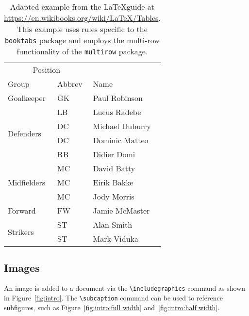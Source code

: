\begin{table}[h] %
    \centering
    \begin{tabular}{lll}
        \toprule
        \multicolumn{2}{c}{Position} \\
        \cmidrule{1-2} %
        Group                        & Abbrev & Name            \\
        \midrule
        Goalkeeper                   & GK     & Paul Robinson   \\
        \midrule
        \multirow{4}{*}{Defenders}   & LB     & Lucus Radebe    \\
        & DC     & Michael Duburry \\
        & DC     & Dominic Matteo  \\
        & RB     & Didier Domi     \\
        \midrule
        \multirow{3}{*}{Midfielders} & MC     & David Batty     \\
        & MC     & Eirik Bakke     \\
        & MC     & Jody Morris     \\
        \midrule
        Forward                      & FW     & Jamie McMaster  \\
        \midrule
        \multirow{2}{*}{Strikers}    & ST     & Alan Smith      \\
        & ST     & Mark Viduka     \\
        \bottomrule
    \end{tabular}
    \caption{Adapted example from the \LaTeX guide at \url{https://en.wikibooks.org/wiki/LaTeX/Tables}. This example uses rules specific to the \texttt{booktabs} package and employs the multi-row functionality of the \texttt{multirow} package.}
    \label{tab:intro} %
\end{table}

\subsection{Images}

An image is added to a document via the \verb|\includegraphics| command as shown in Figure~\ref{fig:intro}.
The \verb|\subcaption| command can be used to reference subfigures, such as Figure~\ref{fig:intro:full width} and~\ref{fig:intro:half width}.

